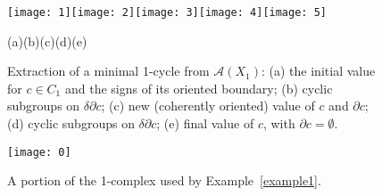 \begin{figure}[htbp] %
   \centering
\texttt{[image: 1]}\texttt{[image: 2]}\texttt{[image: 3]}\texttt{[image: 4]}\texttt{[image: 5]}

{\footnotesize\hspace{.09\textwidth}(a)\hfill(b)\hfill(c)\hfill(d)\hfill(e)\hspace{.09\textwidth}}
\vspace{-2mm}   
\caption{Extraction of a minimal 1-cycle from $\mathcal{A}(X_1)$: (a) the initial value for $c\in C_1$ and the signs of its oriented boundary; (b) cyclic subgroups on $\delta\partial c$; (c) new (coherently oriented) value of $c$ and $\partial c$; (d) cyclic subgroups on $\delta\partial c$; (e) final value of $c$, with $\partial c = \emptyset$.}
\label{fig:step-by-step}
\end{figure}

\begin{figure}[htbp] %
   \centering
   \texttt{[image: 0]} 
   \caption{A portion of the 1-complex used by Example~\ref{example1}.}
   \label{fig:2D-full}
\end{figure}



